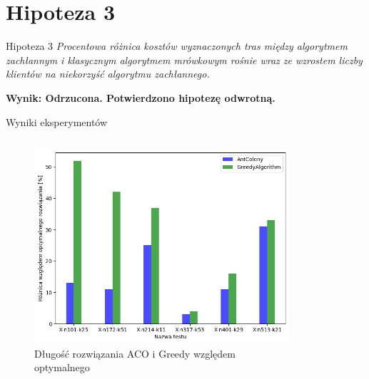 \documentclass{beamer}
\begin{document}
\section*{Hipoteza 3}
\begin{frame}{Hipoteza 3}
    \textit{Procentowa różnica kosztów wyznaczonych tras między algorytmem zachłannym i klasycznym algorytmem mrówkowym rośnie wraz ze wzrostem liczby klientów na niekorzyść algorytmu zachłannego.}
    \vspace{1em}

    \textbf{Wynik: Odrzucona. Potwierdzono hipotezę odwrotną.}
\end{frame}


\begin{frame}{Wyniki eksperymentów}
    \begin{columns}
        \begin{column}{0.55\textwidth}
            \begin{figure}
                \centering
                \includegraphics[width=\linewidth]{../report/img/greed_wzgledem_optymalnego.png}
                \caption{Długość rozwiązania ACO i Greedy względem optymalnego}
            \end{figure}        
        \end{column}
        \begin{column}{0.55\textwidth}
            \begin{figure}
                \centering

\end{figure}
\end{column}
\end{columns}
\end{frame}
\end{document}
